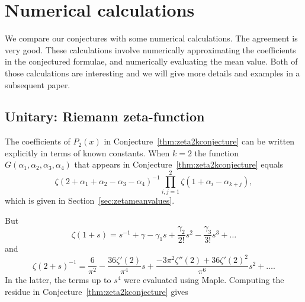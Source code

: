 \documentclass[12pt,letterpaper]{amsart}
\theoremstyle{plain}
\theoremstyle{definition}
\theoremstyle{remark}
\numberwithin{equation}{subsection}
\numberwithin{theorem}{subsection}
\numberwithin{table}{subsection}
\begin{document}


\section{  Numerical calculations
}\label{sec:numerics}



We compare our conjectures with some numerical calculations. The
agreement is very good. These calculations involve numerically
approximating the coefficients in the conjectured formulae, and
numerically evaluating the mean value. Both of those calculations
are interesting and we will give more details and examples in a
subsequent paper.

\subsection{  Unitary: Riemann zeta-function
}\label{sec:riemannzetacalcs}



The coefficients of $P_2(x)$ in Conjecture~\ref{thm:zeta2kconjecture} 
can be written explicitly in terms of
known constants. When $k=2$ the function
$G(\alpha_1,\alpha_2,\alpha_3,\alpha_4)$ that appears in
Conjecture~\ref{thm:zeta2kconjecture} equals
\begin{equation}
\zeta(2+\alpha_1+\alpha_2- \alpha_3-\alpha_4)^{-1} \prod_{i,j=1}^2
\zeta(1+\alpha_i-\alpha_{k+j}),
\end{equation}
which is given in Section~\ref{sec:zetameanvalues}.

But
\begin{equation}
\zeta(1+s)= {s}^{-1}+\gamma-\gamma_1 s +
\frac{\gamma_2}{2!}{s}^{2}- \frac{\gamma_3}{3!}{s}^{3} +\ldots
\end{equation}
and
\begin{equation}
\zeta(2+s)^{-1} = \frac{6}{\pi^2}-\frac{36 \zeta'(2)}{\pi^4} s +
\frac{-3\pi^2\zeta''(2) +36 \zeta'(2)^2 }{\pi^6} s^2 + \ldots.
\end{equation}
In the latter, the terms up to $s^4$ were evaluated using Maple.
Computing the residue in Conjecture~\ref{thm:zeta2kconjecture} gives
\end{document}
